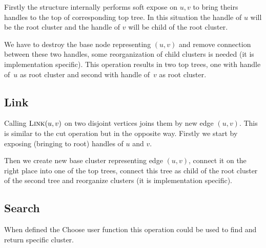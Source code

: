 Firstly the structure internally performs {\I soft expose} on $u,v$ to bring
theirs handles to the top of corresponding top tree. In this situation the
handle of $u$ will be the root cluster and the handle of $v$ will be child of
the root cluster.

We have to destroy the base node representing $(u,v)$ and remove connection
between these two handles, some reorganization of child clusters is needed (it
is implementation specific). This operation results in two top trees, one with
handle of~$u$ as root cluster and second with handle of~$v$ as root cluster.

\subsection{Link}

Calling $\hbox{\sc Link}(u,v)$ on two disjoint vertices joins them by new edge $(u,v)$.
This is similar to the cut operation but in the opposite way. Firstly we start
by {\I exposing} (bringing to root) handles of $u$ and $v$.

Then we create new base cluster representing edge $(u,v)$, connect it on the
right place into one of the top trees, connect this tree as child of the root
cluster of the second tree and reorganize clusters (it is implementation
specific).

\subsection{Search}

When defined the {\I Choose} user function this operation could be used to find
and return specific cluster.
